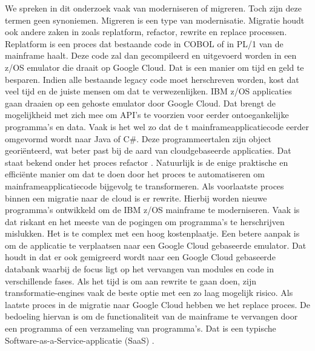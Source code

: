 We spreken in dit onderzoek vaak van moderniseren of migreren. Toch zijn deze termen geen synoniemen. Migreren is een type van modernisatie. Migratie houdt ook andere zaken in zoals replatform, refactor, rewrite en replace processen. Replatform is een proces dat bestaande code in COBOL of in PL/1 van de mainframe haalt. Deze code zal dan gecompileerd en uitgevoerd worden in een z/OS emulator die draait op Google Cloud. Dat is een manier om tijd en geld te besparen. Indien alle bestaande legacy code moet herschreven worden, kost dat veel tijd en de juiste mensen om dat te verwezenlijken. IBM z/OS applicaties gaan draaien op een gehoste emulator door Google Cloud. Dat brengt de mogelijkheid met zich mee om API's te voorzien voor eerder ontoegankelijke programma's en data. Vaak is het wel zo dat de t mainframeapplicatiecode eerder omgevormd wordt naar Java of C\#. Deze programmeertalen zijn object georiënteerd, wat beter past bij de aard van cloudgebaseerde applicaties. Dat staat bekend onder het proces refactor \autocite{Astadia2021}. Natuurlijk is de enige praktische en efficiënte manier om dat te doen door het proces te automatiseren om mainframeapplicatiecode bijgevolg te transformeren. Als voorlaatste proces binnen een migratie naar de cloud is er rewrite. Hierbij worden nieuwe programma's ontwikkeld om de IBM z/OS mainframe te moderniseren. Vaak is dat riskant en het meeste van de pogingen om programma's te herschrijven mislukken. Het is te complex met een hoog kostenplaatje. Een betere aanpak is om de applicatie te verplaatsen naar een Google Cloud gebaseerde emulator. Dat houdt in dat er ook gemigreerd wordt naar een Google Cloud gebaseerde databank waarbij de focus ligt op het vervangen van modules en code in verschillende fases. Als het tijd is om aan rewrite te gaan doen, zijn transformatie-engines vaak de beste optie met een zo laag mogelijk risico. Als laatste proces in de migratie naar Google Cloud hebben we het replace proces. De bedoeling hiervan is om de functionaliteit van de mainframe te vervangen door een programma of een verzameling van programma's. Dat is een typische Software-as-a-Service-applicatie (SaaS) \autocite{Astadia2021}. 

\subsection{}
\label{sec:De uitdagingen van mainframemodernisatie volgens Astadia}

